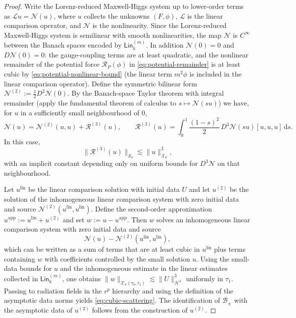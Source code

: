 \documentclass[11pt]{article}
\numberwithin{equation}{section}
\theoremstyle{plain}
\theoremstyle{definition}
\theoremstyle{remark}
\newcommand{\dd}{\mathrm{d}}
\newcommand{\Lin}{\mathsf{Lin}}
\begin{document}
\begin{proof}
Write the Lorenz-reduced Maxwell-Higgs system up to lower-order terms as $\mathcal L u = \mathcal N(u)$, where $u$ collects the unknowns $(F,\phi)$, $\mathcal L$ is the linear comparison operator, and $\mathcal N$ is the nonlinearity.
Since the Lorenz-reduced Maxwell-Higgs system is semilinear with smooth nonlinearities, the map $\mathcal N$ is $C^{\infty}$ between the Banach spaces encoded by $\Lin_{k}^{(m)}$.
In addition $\mathcal N(0)=0$ and $D\mathcal N(0)=0$: the gauge-coupling terms are at least quadratic, and the nonlinear remainder of the potential force $\mathcal R_{P}(\phi)$ in \eqref{eq:potential-remainder} is at least cubic by \eqref{eq:potential-nonlinear-bound} (the linear term $m^{2}\phi$ is included in the linear comparison operator).
Define the symmetric bilinear form $\mathcal N^{(2)}:=\tfrac12 D^{2}\mathcal N(0)$.
By the Banach-space Taylor theorem with integral remainder (apply the fundamental theorem of calculus to $s\mapsto \mathcal N(su)$) we have, for $u$ in a sufficiently small neighbourhood of $0$,
\begin{equation}\label{eq:banach-taylor-N}
\mathcal N(u)=\mathcal N^{(2)}(u,u)+\mathcal R^{(3)}(u),
\qquad
\mathcal R^{(3)}(u)
=
\int_{0}^{1}\frac{(1-s)^{2}}{2}\,D^{3}\mathcal N(su)[u,u,u]\,\dd s.
\end{equation}
In this case,
\begin{equation}
\|\mathcal R^{(3)}(u)\|_{\mathcal S_{k}}\lesssim \|u\|_{\mathcal X_{k}}^{3},
\end{equation}
with an implicit constant depending only on uniform bounds for $D^{3}\mathcal N$ on that neighbourhood.

Let $u^{\mathrm{lin}}$ be the linear comparison solution with initial data $U$ and let $u^{(2)}$ be the solution of the inhomogeneous linear comparison system with zero initial data and source $\mathcal N^{(2)}(u^{\mathrm{lin}},u^{\mathrm{lin}})$.
Define the second-order approximation $u^{\mathrm{app}}:=u^{\mathrm{lin}}+u^{(2)}$ and set $w:=u-u^{\mathrm{app}}$.
Then $w$ solves an inhomogeneous linear comparison system with zero initial data and source
\begin{equation}
\mathcal N(u)-\mathcal N^{(2)}(u^{\mathrm{lin}},u^{\mathrm{lin}}),
\end{equation}
which can be written as a sum of terms that are at least cubic in $u^{\mathrm{lin}}$ plus terms containing $w$ with coefficients controlled by the small solution $u$.
Using the small-data bounds for $u$ and the inhomogeneous estimate in the linear estimates collected in $\Lin_{k}^{(m)}$, one obtains
$\|w\|_{\mathcal X_{k}(\tau_{0},\tau_{1})}\lesssim \|U\|_{\mathcal H^{k}}^{3}$ uniformly in $\tau_{1}$.
Passing to radiation fields in the $r^{p}$ hierarchy and using the definition of the asymptotic data norms yields \eqref{eq:cubic-scattering}.
The identification of $\mathscr B_{\pm}$ with the asymptotic data of $u^{(2)}$ follows from the construction of $u^{(2)}$.
\end{proof}
\end{document}
